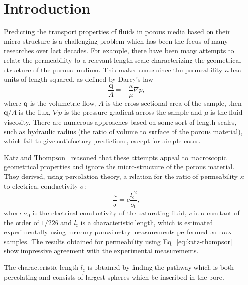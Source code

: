 \documentclass[aps,twocolumn,superscriptaddress,showpacs,showkeys]{revtex4-1}
\newcommand{\lc}{{l_{\mathrm{c}}}}  %
\newcommand{\dpl}{\nabla p}         %
\newcommand{\q}{\vbf{q}}            %
\newcommand{\area}{A}               %
\newcommand{\vbf}[1]{\mathbf{#1}}
\begin{document}
\section{Introduction}
\label{sec:intro}
Predicting the transport properties of fluids in porous media based on their
micro-structure is a challenging problem which has been the focus of many
researches over last decades. For example, there have been many attempts to
relate the permeability to a relevant length scale characterizing the
geometrical structure of the porous medium.  This makes sense since the
permeability $\kappa$ has units of length squared, as defined by Darcy's
law~\cite{bib:darcy,bib:scheidegger}
%
\begin{equation}
\frac{\q}{\area} = -\frac{\kappa}{\mu} \dpl,
\end{equation}
%
where $\q$ is the volumetric flow, $\area$ is the cross-sectional area of the
sample, then $\q/\area$ is the flux, $\dpl$ is the pressure gradient across
the sample and $\mu$ is the fluid viscosity.  There are numerous approaches
based on some sort of length scales, such as hydraulic radius (the ratio of
volume to surface of the porous material), which fail to give satisfactory
predictions, except for simple cases.

Katz and Thompson~\cite{PhysRevB.34.8179} reasoned that these attempts
appeal to macroscopic geometrical properties and ignore the micro-structure of
the porous material.  They derived, using percolation theory, a relation for
the ratio of permeability $\kappa$ to electrical conductivity $\sigma$:
%
\begin{equation}
\frac{\kappa}{\sigma} = c\frac{\lc^2}{\sigma_0},
\label{eq:katz-thompson}
\end{equation}
%
where $\sigma_0$ is the electrical conductivity of the saturating fluid, $c$
is a constant of the order of $1/226$ and $\lc$ is a characteristic
length, which is estimated experimentally using mercury porosimetry
measurements performed on rock samples. The results obtained for permeability
using Eq.~\eqref{eq:katz-thompson} show impressive agreement with the
experimental measurements.

The characteristic length $\lc$ is obtained by finding the pathway which is
both percolating and consists of largest spheres which be inscribed in the
pore.
\end{document}
